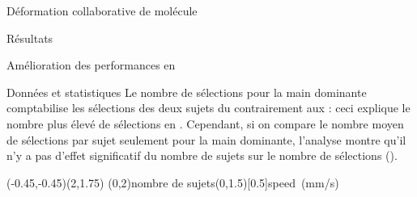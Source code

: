 \documentclass[myfrancais,ngerman,english,french]{mythesis}
\begin{document}
\begin{mychapter}{Déformation collaborative de molécule}
\begin{mysection}{Résultats}
\begin{mysubsection}{Amélioration des performances en }
\begin{mysubsubsection}{Données et statistiques}
					Le nombre de sélections pour la main dominante comptabilise les sélections des deux sujets du  contrairement aux  : ceci explique le nombre plus élevé de sélections en .
					Cependant, si on compare le nombre moyen de sélections par sujet seulement pour la main dominante, l'analyse montre qu'il n'y a pas d'effet significatif du nombre de sujets  sur le nombre de sélections  ().

					\begin{myfigure}
						\begin{myps}(-0.45,-0.45)(2,1.75)
							\myaxes(0,2){nombre de sujets}(0,1.5)[0.5]{speed~(mm/s)}
						\end{myps}
					\end{myfigure}


\end{mysubsubsection}
\end{mysubsection}
\end{mysection}
\end{mychapter}
\end{document}
